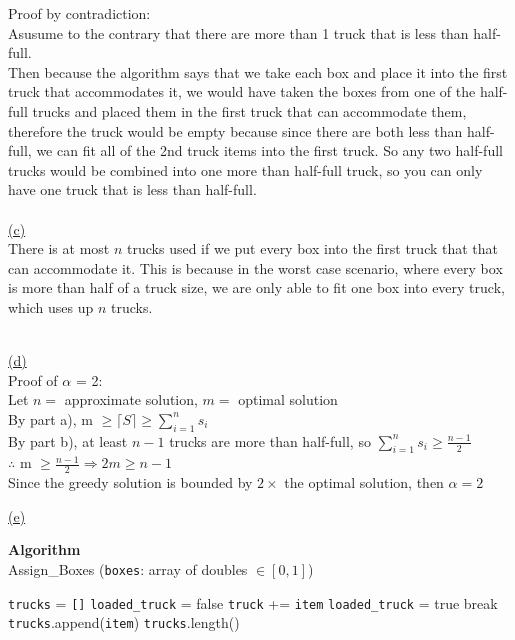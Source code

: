 \documentclass[12pt]{article}
\begin{document}
Proof by contradiction:\\
Asusume to the contrary that there are more than 1 truck that is less than half-full. \\
Then because the algorithm says that we take each box and place it into the first truck that
accommodates it, we would have taken the boxes from one of the half-full trucks and placed
them in the first truck that can accommodate them, therefore the truck would be empty
because since there are both less than half-full, we can fit all of the 2nd truck items into the
first truck. So any two half-full trucks would be combined into one more than half-full truck,
so you can only have one truck that is less than half-full.\\

~\\\hyperlink{toc}{\hypertarget{1.3}{(c)}}\\
There is at most $n$ trucks used if we put every box into the first truck that that can accommodate it.
This is because in the worst case scenario, where every box is more than half of a truck size,
we are only able to fit one box into every truck, which uses up $n$ trucks.

~\\\hyperlink{toc}{\hypertarget{1.4}{(d)}}\\
Proof of $\alpha$ = 2:\\
Let $n =$ approximate solution, $m =$ optimal solution \\
By part a), m $\geq \lceil S \rceil \geq \sum\limits_{i=1}^{n} s_i$\\
By part b), at least $n-1$ trucks are more than half-full, so $\sum\limits_{i=1}^{n} s_i
	\geq \frac{n-1}{2}$\\

$\therefore$ m $\geq \frac{n-1}{2} \Longrightarrow 2m\geq n-1$\\
Since the greedy solution is bounded by $2\times$ the optimal solution, then $\alpha = 2$

\newpage
\hyperlink{toc}{\hypertarget{1.5}{(e)}}\\
\begin{algorithm}
  \caption*{\textbf{Algorithm}\\Assign\_Boxes \big(\texttt{boxes}: array of doubles $\in [0, 1]$\big)}\label{alg:cap}
	\begin{algorithmic}[1]
    \State \texttt{trucks} = \texttt{[]}
    \State
      \State \texttt{loaded\_truck} = false
        \State \texttt{truck} += \texttt{item}
          \State \texttt{loaded\_truck} = true
          \State break
        \EndIf
      \EndFor
        \State \texttt{trucks}.append(\texttt{item})
      \EndIf
    \EndFor
    \State
		\State\Return \texttt{trucks}.length()
	\end{algorithmic}
\end{algorithm}
\end{document}
